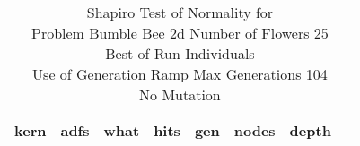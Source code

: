 \begin{table}[H]
\caption{Shapiro Test of Normality for \\ Problem  Bumble Bee 2d  Number of Flowers 25\\Best of Run Individuals \\ Use of Generation Ramp  Max Generations 104\\ No Mutation \\}
\begin{center}
\scalebox{0.8} %
{
\begin{tabular}{lrrrrrrr}
\hline
kern & adfs & what & hits & gen & nodes & depth \\
\hline


\end{tabular}
}
\end{center}
\end{table}

